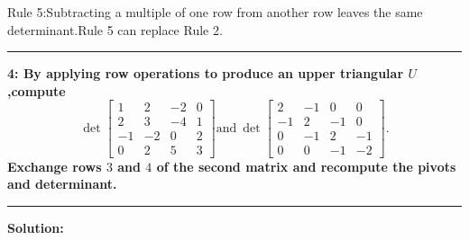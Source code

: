 \documentclass[11pt]{article}
\newcommand\question[2]{\vspace{.25in}\hrule\textbf{#1: #2}\vspace{.5em}\hrule\vspace{.10in}}
\newcommand\solution{\vspace{.10in}\textbf{Solution: }}
\begin{document}
Rule 5:Subtracting a multiple of one row from another row leaves the
same determinant.Rule 5 can replace Rule 2.
\question{4}{By applying row operations to produce an upper triangular
$U$,compute
$$
\det
\begin{bmatrix}
  1&2&-2&0\\
  2&3&-4&1\\
  -1&-2&0&2\\
  0&2&5&3
\end{bmatrix}\mbox{and} ~\det
\begin{bmatrix}
  2&-1&0&0\\
 -1&2&-1&0\\
0&-1&2&-1\\
0&0&-1&-2
\end{bmatrix}.
$$
Exchange rows $3$ and $4$ of the second matrix and recompute the
pivots and determinant.
}
\solution
\end{document}
